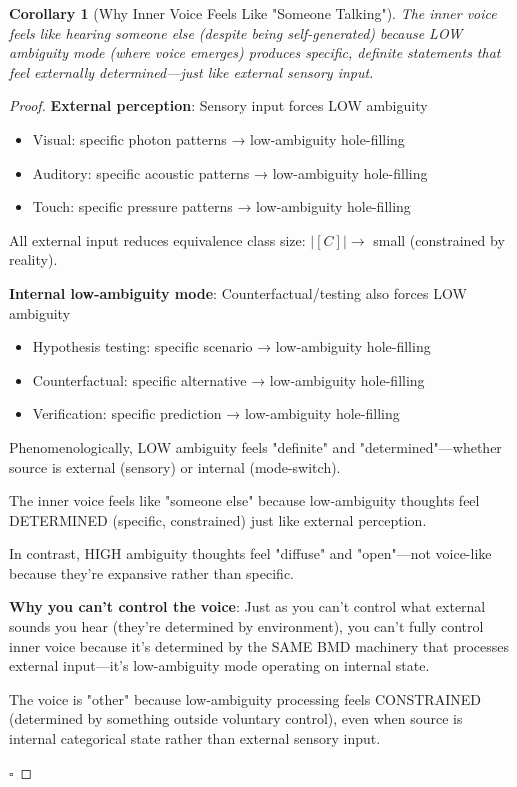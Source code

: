 \documentclass[11pt,a4paper]{article}
\newtheorem{corollary}[theorem]{Corollary}
\begin{document}
\begin{corollary}[Why Inner Voice Feels Like "Someone Talking"]
\label{cor:voice_other}
The inner voice feels like hearing someone else (despite being self-generated) because LOW ambiguity mode (where voice emerges) produces specific, definite statements that feel externally determined—just like external sensory input.
\end{corollary}

\begin{proof}
\textbf{External perception}: Sensory input forces LOW ambiguity
\begin{itemize}
\item Visual: specific photon patterns → low-ambiguity hole-filling
\item Auditory: specific acoustic patterns → low-ambiguity hole-filling
\item Touch: specific pressure patterns → low-ambiguity hole-filling
\end{itemize}

All external input reduces equivalence class size: $|[C]| \to$ small (constrained by reality).

\textbf{Internal low-ambiguity mode}: Counterfactual/testing also forces LOW ambiguity
\begin{itemize}
\item Hypothesis testing: specific scenario → low-ambiguity hole-filling
\item Counterfactual: specific alternative → low-ambiguity hole-filling
\item Verification: specific prediction → low-ambiguity hole-filling
\end{itemize}

Phenomenologically, LOW ambiguity feels "definite" and "determined"—whether source is external (sensory) or internal (mode-switch).

The inner voice feels like "someone else" because low-ambiguity thoughts feel DETERMINED (specific, constrained) just like external perception.

In contrast, HIGH ambiguity thoughts feel "diffuse" and "open"—not voice-like because they're expansive rather than specific.

\textbf{Why you can't control the voice}: Just as you can't control what external sounds you hear (they're determined by environment), you can't fully control inner voice because it's determined by the SAME BMD machinery that processes external input—it's low-ambiguity mode operating on internal state.

The voice is "other" because low-ambiguity processing feels CONSTRAINED (determined by something outside voluntary control), even when source is internal categorical state rather than external sensory input.

$\square$
\end{proof}
\end{document}
